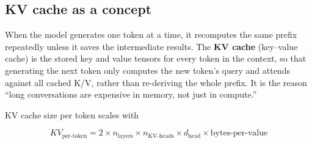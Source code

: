\subsection{KV cache as a concept}\label{kv-cache-as-a-concept}

When the model generates one token at a time, it recomputes the same
prefix repeatedly unless it saves the intermediate results. The
\textbf{KV cache} (key--value cache) is the stored key and value tensors
for every token in the context, so that generating the next token only
computes the new token's query and attends against all cached K/V,
rather than re-deriving the whole prefix. It is the reason ``long
conversations are expensive in memory, not just in compute.''

KV cache size per token scales with

\[
KV_{\text{per-token}} = 2 \times n_\text{layers} \times n_{\text{KV-heads}} \times d_\text{head} \times \text{bytes-per-value}
\]

